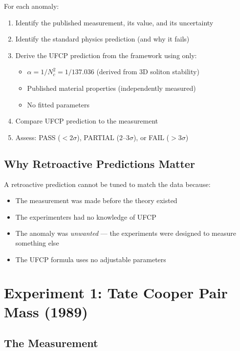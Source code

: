 \documentclass[11pt, a4paper]{article}
\begin{document}
For each anomaly:
\begin{enumerate}[nosep]
  \item Identify the published measurement, its value, and its
        uncertainty
  \item Identify the standard physics prediction (and why it fails)
  \item Derive the UFCP prediction from the framework using only:
        \begin{itemize}[nosep]
          \item $\alpha = 1/N_c^2 = 1/137.036$ (derived from 3D soliton stability)
          \item Published material properties (independently measured)
          \item No fitted parameters
        \end{itemize}
  \item Compare UFCP prediction to the measurement
  \item Assess: PASS ($<2\sigma$), PARTIAL ($2$--$3\sigma$),
        or FAIL ($>3\sigma$)
\end{enumerate}

\subsection{Why Retroactive Predictions Matter}

A retroactive prediction cannot be tuned to match the data because:
\begin{itemize}[nosep]
  \item The measurement was made before the theory existed
  \item The experimenters had no knowledge of UFCP
  \item The anomaly was \emph{unwanted} --- the experiments were
        designed to measure something else
  \item The UFCP formula uses no adjustable parameters
\end{itemize}

\section{Experiment 1: Tate Cooper Pair Mass (1989)}

\subsection{The Measurement}
\end{document}
